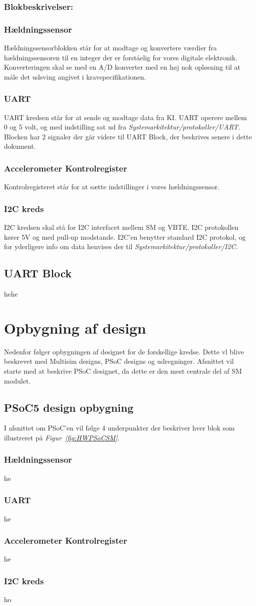 \subsubsection{Blokbeskrivelser:}
\subsubsection{Hældningssensor}
Hældningssensorblokken står for at modtage og konvertere værdier fra hældningssensoren til en integer der er forståelig for vores digitale elektronik. Konverteringen skal se med en A/D konverter med en høj nok opløsning til at måle det udsving angivet i kravspecifikationen.
\subsubsection{UART}
UART kredsen står for at sende og modtage data fra KI. UART operere mellem 0 og 5 volt, og med indstilling sat ud fra \textit{Systemarkitektur/protokoller/UART}. Blocken har 2 signaler der går videre til UART Block, der beskrives senere i dette dokument. 
\subsubsection{Accelerometer Kontrolregister}
Kontrolregisteret står for at sætte indstillinger i vores hældningssensor.
\subsubsection{I2C kreds}
I2C kredsen skal stå for I2C interfacet mellem SM og VBTE. I2C protokollen kører 5V og med pull-up modstande. I2C'en benytter standard I2C protokol, og for yderligere info om data henvises der til \textit{Systemarkitektur/protokoller/I2C}.
\subsection{UART Block}
hehe

\section{Opbygning af design}
Nedenfor følger opbygningen af designet for de forskellige kredse. Dette vl blive beskrevet med Multisim designs, PSoC designs og udregninger. Afsnittet vil starte med at beskrive PSoC designet, da dette er den mest centrale del af SM modulet.
\subsection{PSoC5 design opbygning}
I afsnittet om PSoC'en vil følge 4 underpunkter der beskriver hver blok som illustreret på \textit{Figur~\ref{fig:HWPSoCSM}}.
\subsubsection{Hældningssensor}
he
\subsubsection{UART}
he
\subsubsection{Accelerometer Kontrolregister}
he
\subsubsection{I2C kreds}
ho